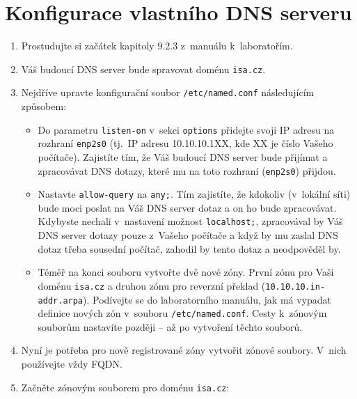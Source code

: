 \section{Konfigurace vlastního DNS serveru}
\begin{enumerate}
  \item Prostudujte si začátek kapitoly 9.2.3 z~manuálu k~laboratořím.
  \item Váš budoucí DNS server bude spravovat doménu  {\tt isa.cz}.
  \item Nejdříve upravte konfigurační soubor {\tt /etc/named.conf} následujícím způsobem:
    \begin{itemize}
      \item Do parametru {\tt listen-on} v~sekci {\tt options} přidejte svoji IP adresu na rozhraní {\tt enp2s0}
            (tj.~IP adresu 10.10.10.1XX, kde XX je číslo Vašeho počítače).
            Zajistíte tím, že Váš budoucí DNS server bude přijímat a zpracovávat DNS dotazy, které mu na toto rozhraní ({\tt enp2s0}) přijdou. 
      \item Nastavte {\tt allow-query} na {\tt any;}.
            Tím zajistíte, že kdokoliv (v~lokální síti) bude moci poslat na Váš DNS server dotaz a on ho bude zpracovávat.
            Kdybyste nechali v~nastavení možnost {\tt localhost;}, zpracovával by Váš DNS server dotazy pouze z~Vašeho počítače a
            když by mu zaslal DNS dotaz třeba sousední počítač, zahodil by tento dotaz a neodpověděl by.
      \item Téměř na konci souboru vytvořte dvě nové zóny. První zónu pro Vaši doménu {\tt isa.cz} a druhou zónu pro reverzní překlad ({\tt 10.10.10.in-addr.arpa}).
            Podívejte se do laboratorního manuálu, jak má vypadat definice nových zón v~souboru {\tt /etc/named.conf}.
            Cesty k~zónovým souborům nastavíte později -- až po vytvoření těchto souborů.
    \end{itemize}
  
  \item Nyní je potřeba pro nově registrované zóny vytvořit zónové soubory. V~nich používejte vždy FQDN.
  \item Začněte zónovým souborem pro doménu {\tt isa.cz}:
  

\end{enumerate}
